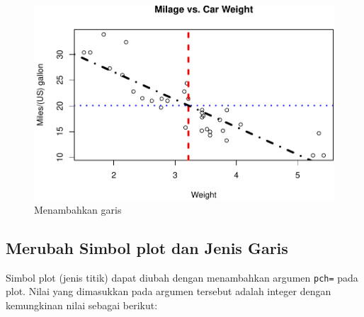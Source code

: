 \documentclass[]{book}
\begin{document}
\begin{figure}

{\centering \includegraphics[width=0.7\linewidth]{EnvStat_files/figure-latex/abline-1} 

}

\caption{Menambahkan garis}\label{fig:abline}
\end{figure}

\subsection{Merubah Simbol plot dan Jenis
Garis}\label{merubah-simbol-plot-dan-jenis-garis}

Simbol plot (jenis titik) dapat diubah dengan menambahkan argumen
\texttt{pch=} pada plot. Nilai yang dimasukkan pada argumen tersebut
adalah integer dengan kemungkinan nilai sebagai berikut:
\end{document}
